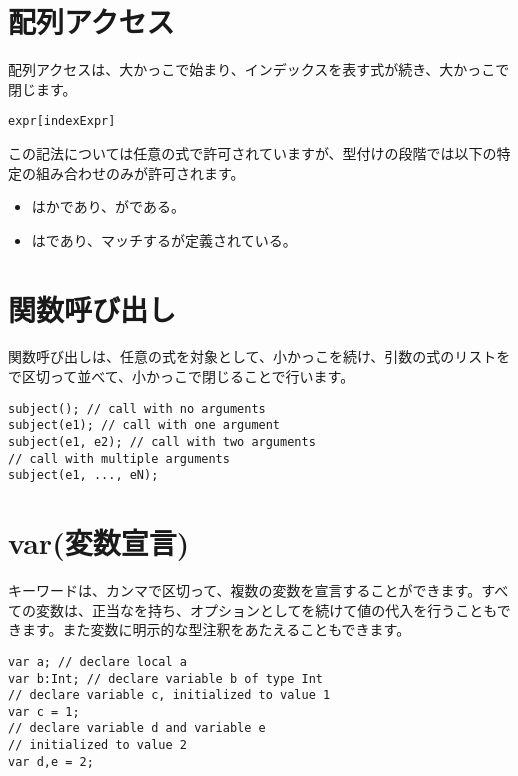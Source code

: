 \section{配列アクセス}
\label{expression-array-access}

配列アクセスは、大かっこ\expr{[}で始まり、インデックスを表す式が続き、大かっこ\expr{]}で閉じます。

\begin{lstlisting}
expr[indexExpr]
\end{lstlisting}

この記法については任意の式で許可されていますが、型付けの段階では以下の特定の組み合わせのみが許可されます。

\begin{itemize}
	\item {}はかであり、がである。
	\item {}はであり、マッチするが定義されている。
\end{itemize}

\section{関数呼び出し}
\label{expression-function-call}

関数呼び出しは、任意の式を対象として、小かっこ\expr{(}を続け、引数の式のリストを\expr{,}で区切って並べて、小かっこ\expr{)}で閉じることで行います。

\begin{lstlisting}
subject(); // call with no arguments
subject(e1); // call with one argument
subject(e1, e2); // call with two arguments
// call with multiple arguments
subject(e1, ..., eN);
\end{lstlisting}

\section{var(変数宣言)}
\label{expression-var}

キーワードは、カンマ\expr{,}で区切って、複数の変数を宣言することができます。すべての変数は、正当なを持ち、オプションとして\expr{=}を続けて値の代入を行うこともできます。また変数に明示的な型注釈をあたえることもできます。

\begin{lstlisting}
var a; // declare local a
var b:Int; // declare variable b of type Int
// declare variable c, initialized to value 1
var c = 1;
// declare variable d and variable e
// initialized to value 2
var d,e = 2;
\end{lstlisting}

